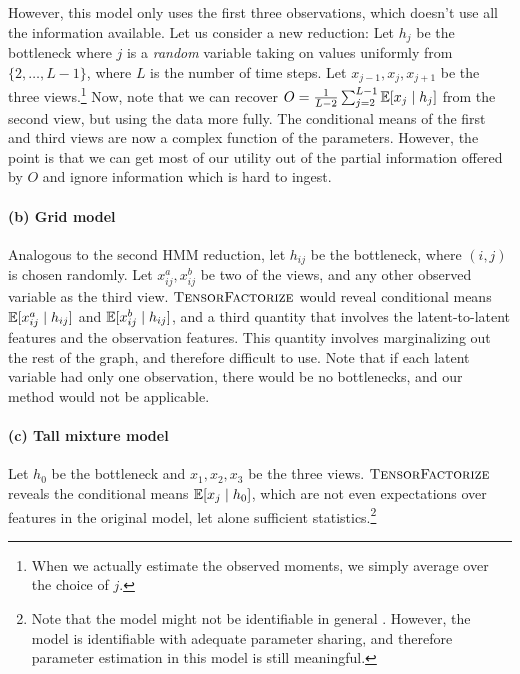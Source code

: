 However, this model only uses the first three observations,
which doesn't use all the information available.
Let us consider a new reduction:
Let $h_j$ be the bottleneck where $j$ is a \emph{random} variable
taking on values uniformly from $\{2,
\dots, L-1\}$, where $L$ is the number of time steps.
Let $x_{j-1},x_j,x_{j+1}$ be the three views.\footnote{
When we actually estimate the observed moments, we simply average over the choice of $j$.}
Now, note that we can recover $O = \frac{1}{L-2} \sum_{j=2}^{L-1} \mathbb{E}[x_j \mid h_j]$ from the second view,
but using the data more fully.  The conditional means of the first and third
views are now a complex function of the parameters.
However, the point is that we can get most of our utility out of the partial
information offered by $O$ and ignore information which is hard to ingest.

\paragraph{(b) Grid model}
Analogous to the second HMM reduction, let $h_{ij}$ be the bottleneck,
where $(i,j)$ is chosen randomly.
Let $x_{ij}^a,x_{ij}^b$ be two of the views, and any other observed variable as the third view.
$\text{\sc TensorFactorize}$ would reveal conditional means $\mathbb{E}[x_{ij}^a \mid h_{ij}]$
and $\mathbb{E}[x_{ij}^b \mid h_{ij}]$,
and a third quantity that involves the latent-to-latent features and the observation features.
This quantity involves marginalizing out the rest of the graph,
and therefore difficult to use.
Note that if each latent variable had only one observation,
there would be no bottlenecks, and our method would not be applicable.

\paragraph{(c) Tall mixture model}
Let $h_0$ be the bottleneck and $x_1,x_2,x_3$ be the three
views.
$\text{\sc TensorFactorize}$ reveals the conditional means $\mathbb{E}[x_j \mid h_0]$, which are
not even expectations over features in the original model, let alone sufficient
statistics.\footnote{Note that
the model might not be identifiable in general \cite{anandkumar11tree}.
However, the model is identifiable with adequate parameter sharing,
and therefore
parameter estimation in this model is still meaningful.}

